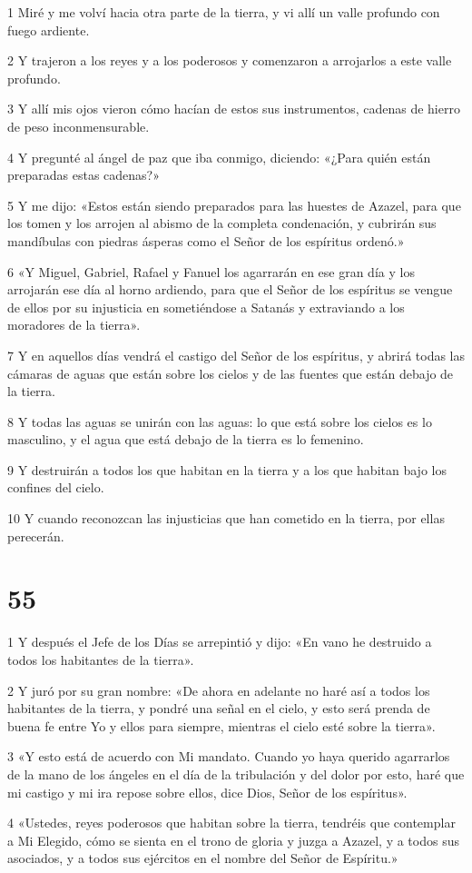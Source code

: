 \par 1 Miré y me volví hacia otra parte de la tierra, y vi allí un valle profundo con fuego ardiente.
\par 2 Y trajeron a los reyes y a los poderosos y comenzaron a arrojarlos a este valle profundo.
\par 3 Y allí mis ojos vieron cómo hacían de estos sus instrumentos, cadenas de hierro de peso inconmensurable.
\par 4 Y pregunté al ángel de paz que iba conmigo, diciendo: «¿Para quién están preparadas estas cadenas?»
\par 5 Y me dijo: «Estos están siendo preparados para las huestes de Azazel, para que los tomen y los arrojen al abismo de la completa condenación, y cubrirán sus mandíbulas con piedras ásperas como el Señor de los espíritus ordenó.»
\par 6 «Y Miguel, Gabriel, Rafael y Fanuel los agarrarán en ese gran día y los arrojarán ese día al horno ardiendo, para que el Señor de los espíritus se vengue de ellos por su injusticia en sometiéndose a Satanás y extraviando a los moradores de la tierra».
\par 7 Y en aquellos días vendrá el castigo del Señor de los espíritus, y abrirá todas las cámaras de aguas que están sobre los cielos y de las fuentes que están debajo de la tierra.
\par 8 Y todas las aguas se unirán con las aguas: lo que está sobre los cielos es lo masculino, y el agua que está debajo de la tierra es lo femenino.
\par 9 Y destruirán a todos los que habitan en la tierra y a los que habitan bajo los confines del cielo.
\par 10 Y cuando reconozcan las injusticias que han cometido en la tierra, por ellas perecerán.

\chapter{55}

\par 1 Y después el Jefe de los Días se arrepintió y dijo: «En vano he destruido a todos los habitantes de la tierra».
\par 2 Y juró por su gran nombre: «De ahora en adelante no haré así a todos los habitantes de la tierra, y pondré una señal en el cielo, y esto será prenda de buena fe entre Yo y ellos para siempre, mientras el cielo esté sobre la tierra».
\par 3 «Y esto está de acuerdo con Mi mandato. Cuando yo haya querido agarrarlos de la mano de los ángeles en el día de la tribulación y del dolor por esto, haré que mi castigo y mi ira repose sobre ellos, dice Dios, Señor de los espíritus».
\par 4 «Ustedes, reyes poderosos que habitan sobre la tierra, tendréis que contemplar a Mi Elegido, cómo se sienta en el trono de gloria y juzga a Azazel, y a todos sus asociados, y a todos sus ejércitos en el nombre del Señor de Espíritu.»

